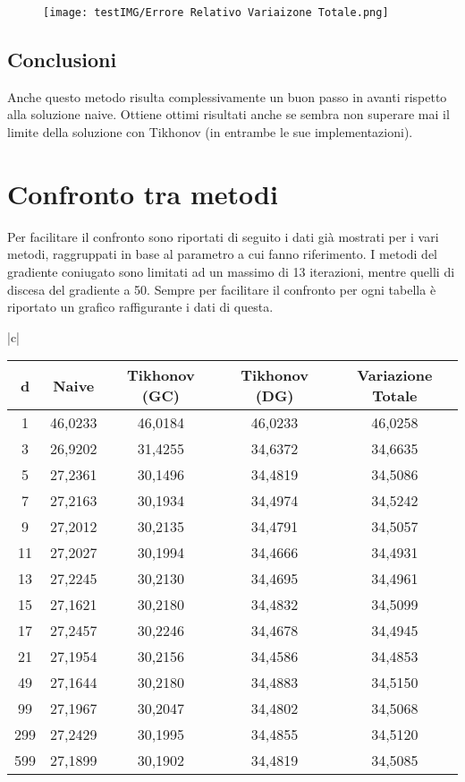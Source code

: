 \documentclass{article}
\begin{document}
\begin{figure}
    \centering
    \texttt{[image: testIMG/Errore Relativo Variaizone Totale.png]}
\end{figure}

\subsection{Conclusioni}
Anche questo metodo risulta complessivamente un buon passo in avanti rispetto
alla soluzione naive. Ottiene ottimi risultati anche se sembra non superare mai il limite
della soluzione con Tikhonov (in entrambe le sue implementazioni).

\section{Confronto tra metodi}
Per facilitare il confronto sono riportati di seguito i dati già mostrati per i vari
metodi, raggruppati in base al parametro a cui fanno riferimento. I metodi del gradiente
coniugato sono limitati ad un massimo di 13 iterazioni, mentre
quelli di discesa del gradiente a 50. Sempre per facilitare il confronto per ogni tabella
è riportato un grafico raffigurante i dati di questa.

\vspace{1cm}
\begin{tabular}{ |c|}
\hline
{} \\
\hline
\begin{tabular}{c|c|c|c|c}
d &	Naive &	Tikhonov (GC) &	Tikhonov (DG) &	Variazione Totale \\
\hline
1 & 46,0233 & 46,0184 & 46,0233 & 46,0258 \\
3 & 26,9202 & 31,4255 & 34,6372 & 34,6635 \\
5 & 27,2361 & 30,1496 & 34,4819 & 34,5086 \\
7 & 27,2163 & 30,1934 & 34,4974 & 34,5242 \\
9 & 27,2012 & 30,2135 & 34,4791 & 34,5057 \\
11 & 27,2027 & 30,1994 & 34,4666 & 34,4931 \\
13 & 27,2245 & 30,2130 & 34,4695 & 34,4961 \\
15 & 27,1621 & 30,2180 & 34,4832 & 34,5099 \\
17 & 27,2457 & 30,2246 & 34,4678 & 34,4945 \\
21 & 27,1954 & 30,2156 & 34,4586 & 34,4853 \\
49 & 27,1644 & 30,2180 & 34,4883 & 34,5150 \\
99 & 27,1967 & 30,2047 & 34,4802 & 34,5068 \\
299 & 27,2429 & 30,1995 & 34,4855 & 34,5120\\
599 & 27,1899 & 30,1902 & 34,4819 & 34,5085 \\
\hline
\end{tabular}
\end{tabular}
\end{document}
